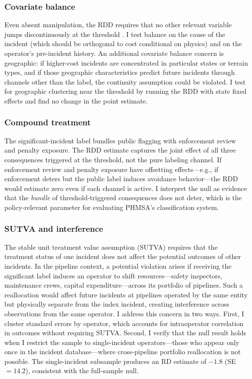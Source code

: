 \documentclass[12pt]{article}
\begin{document}
\subsubsection*{Covariate balance} Even absent manipulation, the RDD requires that no other relevant variable jumps discontinuously at the threshold \citep{imbens2008regression, lee2010regression}. I test balance on the cause of the incident (which should be orthogonal to cost conditional on physics) and on the operator's pre-incident history. An additional covariate balance concern is geographic: if higher-cost incidents are concentrated in particular states or terrain types, and if those geographic characteristics predict future incidents through channels other than the label, the continuity assumption could be violated. I test for geographic clustering near the threshold by running the RDD with state fixed effects and find no change in the point estimate.

\subsubsection*{Compound treatment} The significant-incident label bundles public flagging with enforcement review and penalty exposure. The RDD estimate captures the joint effect of all three consequences triggered at the threshold, not the pure labeling channel. If enforcement review and penalty exposure have offsetting effects---e.g., if enforcement deters but the public label induces avoidance behavior---the RDD would estimate zero even if each channel is active. I interpret the null as evidence that the \textit{bundle} of threshold-triggered consequences does not deter, which is the policy-relevant parameter for evaluating PHMSA's classification system.

\subsubsection*{SUTVA and interference} The stable unit treatment value assumption (SUTVA) requires that the treatment status of one incident does not affect the potential outcomes of other incidents. In the pipeline context, a potential violation arises if receiving the significant label induces an operator to shift resources---safety inspectors, maintenance crews, capital expenditure---across its portfolio of pipelines. Such a reallocation would affect future incidents at pipelines operated by the same entity but physically separate from the index incident, creating interference across observations from the same operator. I address this concern in two ways. First, I cluster standard errors by operator, which accounts for intraoperator correlation in outcomes without requiring SUTVA. Second, I verify that the null result holds when I restrict the sample to single-incident operators---those who appear only once in the incident database---where cross-pipeline portfolio reallocation is not possible. The single-incident subsample produces an RD estimate of $-1.8$ (SE $= 14.2$), consistent with the full-sample null.
\end{document}
